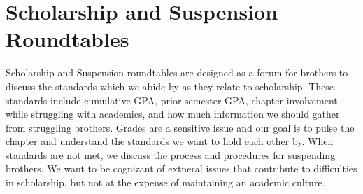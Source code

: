   \section*{Scholarship and Suspension Roundtables}
    Scholarship and Suspension roundtables are designed as a forum for brothers to discuss the standards which we abide by as they relate to scholarship. These standards include cumulative GPA, prior semester GPA, chapter involvement while struggling with academics, and how much information we should gather from struggling brothers. Grades are a sensitive issue and our goal is to pulse the chapter  and understand the standards we want to hold each other by. When standards are not met, we discuss the process and procedures for suspending brothers. We want to be cognizant of extneral issues that contribute to difficulties in scholarship, but not at the expense of maintaining an academic culture.

